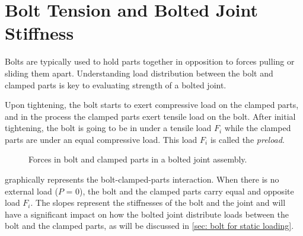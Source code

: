 \documentclass[
10pt,
a4paper,
openany,
svgnames,
]{book}
\begin{document}
\section{Bolt Tension and Bolted Joint Stiffness}

Bolts are typically used to hold parts together in opposition to forces pulling or sliding them apart. Understanding load distribution between the bolt and clamped parts is key to evaluating strength of a bolted joint.

Upon tightening, the bolt starts to exert compressive load on the clamped parts, and in the process the clamped parts exert tensile load on the bolt. After initial tightening, the bolt is going to be in under a tensile load $F_i$ while the clamped parts are under an equal compressive load. This load $F_i$ is called the \emph{preload}.

\begin{figure}[h]
  \centering
  \caption{Forces in bolt and clamped parts in a bolted joint assembly.}
  \label{fig: bolt-joint interaction}
\end{figure}

 graphically represents the bolt-clamped-parts interaction. When there is no external load ($P$ = 0), the bolt and the clamped parts carry equal and opposite load $F_i$. The slopes represent the stiffnesses of the bolt and the joint and will have a significant impact on how the bolted joint distribute loads between the bolt and the clamped parts, as will be discussed in \cref{sec: bolt for static loading}.
\end{document}
